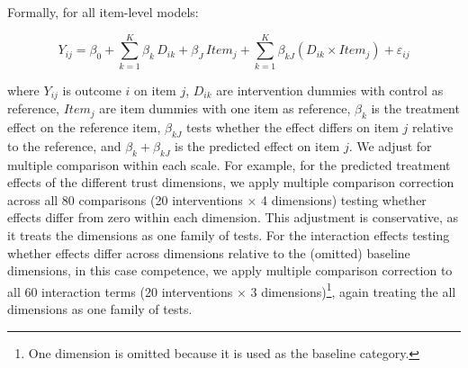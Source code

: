 \documentclass[
  letterpaper,
  DIV=11,
  numbers=noendperiod]{scrartcl}
\begin{document}
Formally, for all item-level models:

\[Y_{ij} = \beta_0 + \sum_{k=1}^{K} \beta_k \, D_{ik} + \beta_J \, Item_j + \sum_{k=1}^{K} \beta_{kJ} (D_{ik} \times Item_j) + \varepsilon_{ij}\]

where \(Y_{ij}\) is outcome \(i\) on item \(j\), \(D_{ik}\) are
intervention dummies with control as reference, \(Item_j\) are item
dummies with one item as reference, \(\beta_k\) is the treatment effect
on the reference item, \(\beta_{kJ}\) tests whether the effect differs
on item \(j\) relative to the reference, and \(\beta_k + \beta_{kJ}\) is
the predicted effect on item \(j\). We adjust for multiple comparison
within each scale. For example, for the predicted treatment effects of
the different trust dimensions, we apply multiple comparison correction
across all 80 comparisons (20 interventions × 4 dimensions) testing
whether effects differ from zero within each dimension. This adjustment
is conservative, as it treats the dimensions as one family of tests. For
the interaction effects testing whether effects differ across dimensions
relative to the (omitted) baseline dimensions, in this case competence,
we apply multiple comparison correction to all 60 interaction terms (20
interventions × 3 dimensions)\footnote{One dimension is omitted because
  it is used as the baseline category.}, again treating the all
dimensions as one family of tests.
\end{document}
